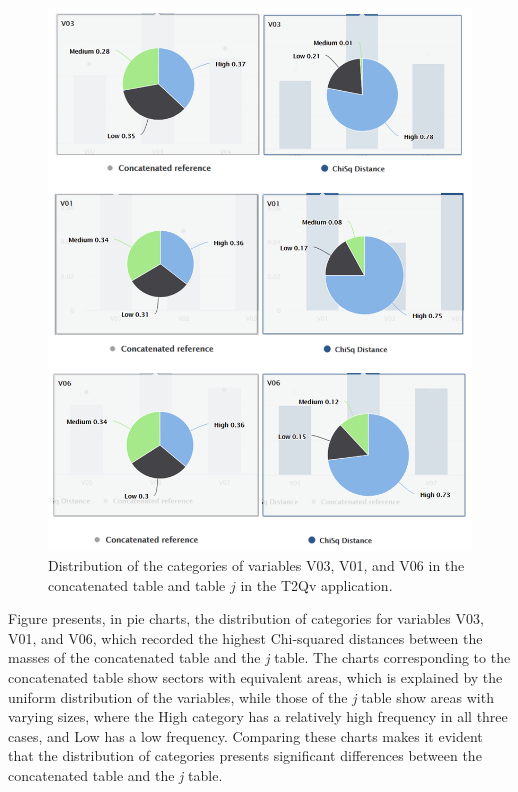 \documentclass[mathematics,article,submit,moreauthors,pdftex]{mdpi}
\begin{document}
\begin{figure}[H]


\begin{center}\includegraphics[width=0.9\linewidth,]{distcomp} \end{center}

\caption{Distribution of the categories of variables V03, V01, and V06 in the concatenated table and table $j$ in the T2Qv application.}

\label{fig:distcomp}
\end{figure}

Figure \label{fig:distcomp} presents, in pie charts, the distribution of
categories for variables V03, V01, and V06, which recorded the highest
Chi-squared distances between the masses of the concatenated table and
the \emph{j} table. The charts corresponding to the concatenated table
show sectors with equivalent areas, which is explained by the uniform
distribution of the variables, while those of the \emph{j} table show
areas with varying sizes, where the High category has a relatively high
frequency in all three cases, and Low has a low frequency. Comparing
these charts makes it evident that the distribution of categories
presents significant differences between the concatenated table and the
\emph{j} table.
\end{document}
